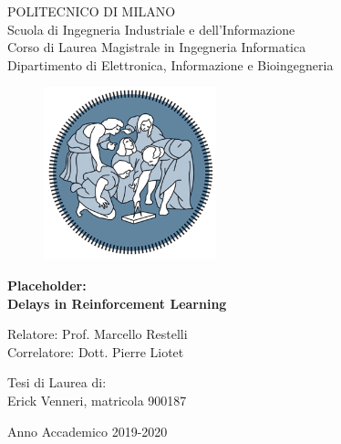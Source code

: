 \begin{titlepage}
    \vspace*{-1.5cm}
    \begin{center}
        \Large
        POLITECNICO DI MILANO\\
        \large
        Scuola di Ingegneria Industriale e dell’Informazione\\
        Corso di Laurea Magistrale in Ingegneria Informatica\\
        \normalsize
        Dipartimento di Elettronica, Informazione e Bioingegneria
        
        \vspace*{1.5cm}
        \begin{figure}[htbp]
            \begin{center}
                \includegraphics[width=5cm]{images/logopolimi.png}
            \end{center}
        \end{figure}
        
        \vspace*{0.5cm}
        \LARGE
        \textbf{Placeholder:\\Delays in Reinforcement Learning}\\

        \vspace*{.75truecm}
    \end{center}
    
    \vspace*{3.0cm}
    \large
    
    \begin{flushleft}
        Relatore: Prof. Marcello Restelli\\
        Correlatore: Dott. Pierre Liotet
    \end{flushleft}
    
    \vspace*{1.0cm}
    
    \begin{flushright}
        Tesi di Laurea di:\\
        Erick Venneri, matricola 900187\\
    \end{flushright}
    
    \vspace*{1cm}
    \begin{center}
        Anno Accademico 2019-2020
    \end{center}

\end{titlepage}